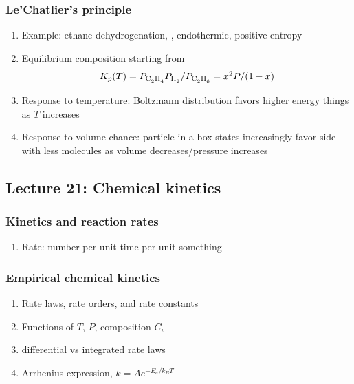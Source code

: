 \documentclass[11pt]{article}
\begin{document}
\subsubsection{Le'Chatlier's principle}
\label{sec:org9979edc}
\begin{enumerate}
\item Example: ethane dehydrogenation, , endothermic, positive entropy
\item Equilibrium composition starting from 
\[ K_p(T) = P_{\ce{C2H4}}P_{\ce{H2}}/P_{\ce{C2H6}} = x^2 P/(1-x) \]
\item Response to temperature: Boltzmann distribution favors higher energy things as \(T\) increases
\item Response to volume chance: particle-in-a-box states increasingly favor side with less molecules as volume decreases/pressure increases
\end{enumerate}


\subsection{Lecture 21: Chemical kinetics}
\label{sec:org3ce7c3e}
\subsubsection{Kinetics and reaction rates}
\label{sec:org8114cf1}
\begin{enumerate}
\item Rate: number per unit time per unit something
\end{enumerate}

\subsubsection{Empirical chemical kinetics}
\label{sec:orgfd5d97e}
\begin{enumerate}
\item Rate laws, rate orders, and rate constants
\item Functions of \(T\), \(P\), composition \(C_i\)
\item differential vs integrated rate laws
\item Arrhenius expression, \(k=A e^{-E_a/k_BT}\)
\end{enumerate}
\end{document}

